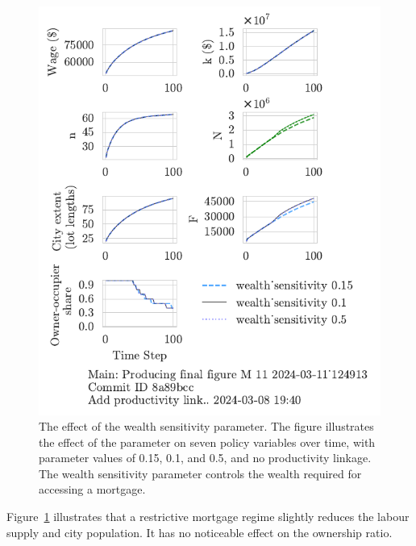 \begin{figure}[h!bt]
    \centering
    \includegraphics[scale=1, trim={0 1.4cm 0 0},clip]{fig/wealth_sensitivity-124913.pdf}
    \caption[The effect of the wealth sensitivity parameter]{The effect of the wealth sensitivity parameter. The figure illustrates the effect of the parameter on seven policy variables over time, with parameter values of 0.15, 0.1, and 0.5, and no productivity linkage. The wealth sensitivity parameter controls the wealth required for accessing a mortgage.}  
    \label{fig:wealth_sensitivity_ownership_trajectory}
\end{figure}

Figure~\ref{fig:wealth_sensitivity_ownership_trajectory} illustrates that a restrictive mortgage regime slightly reduces the labour supply and city population. It has no noticeable effect on the ownership ratio. %

